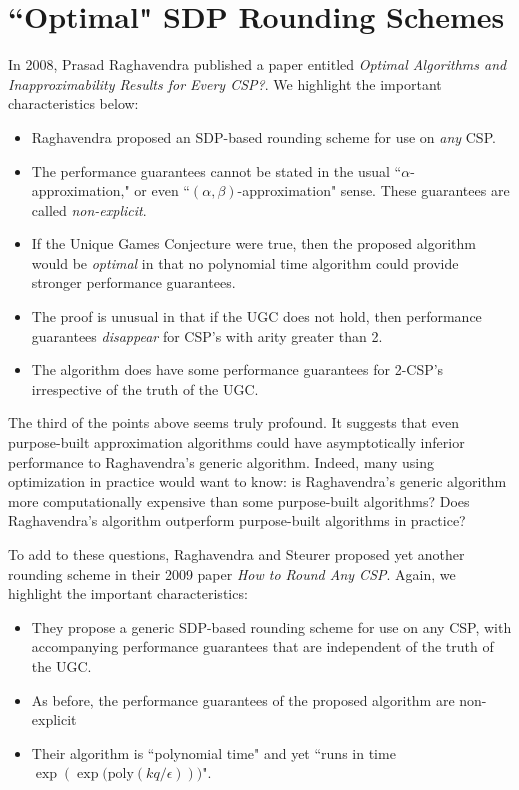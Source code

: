 \documentclass[letterpaper, 12pt]{article}
\numberwithin{equation}{section}
\begin{document}
\newpage
\section{``Optimal" SDP Rounding Schemes}\label{sec:optRoundSchemes}
In 2008, Prasad Raghavendra published a paper entitled \textit{Optimal Algorithms and Inapproximability Results for Every CSP?}. We highlight the important characteristics below:

\begin{itemize}
\item Raghavendra proposed an SDP-based rounding scheme for use on \textit{any} CSP.
\item The performance guarantees cannot be stated in the usual ``$\alpha$-approximation," or even ``$(\alpha,\beta)$-approximation" sense.  These guarantees are called \textit{non-explicit}.
\item If the Unique Games Conjecture were true, then the proposed algorithm would be \textit{optimal} in that no polynomial time algorithm could provide stronger performance guarantees.
\item The proof is unusual in that if the UGC does not hold, then performance guarantees \textit{disappear} for CSP's with arity greater than 2.
\item The algorithm does have some performance guarantees for 2-CSP's irrespective of the truth of the UGC.
\end{itemize}

The third of the points above seems truly profound. It suggests that even purpose-built approximation algorithms could have asymptotically inferior performance to Raghavendra's generic algorithm. Indeed, many using optimization in practice would want to know: is Raghavendra's generic algorithm more computationally expensive than some purpose-built algorithms? Does Raghavendra's algorithm outperform purpose-built algorithms in practice? 

To add to these questions, Raghavendra and Steurer proposed yet another rounding scheme in their 2009 paper \textit{How to Round Any CSP}. Again, we highlight the important characteristics:

\begin{itemize}
\item They propose a generic SDP-based rounding scheme for use on any CSP, with accompanying performance guarantees that are independent of the truth of the UGC.
\item As before, the performance guarantees of the proposed algorithm are non-explicit
\item Their algorithm is ``polynomial time" and yet ``runs in time $\exp{(\exp{(\text{poly}(kq/\epsilon)}))}$".
\end{itemize}
\end{document}
